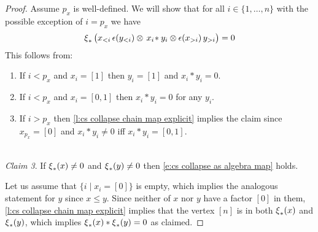 \begin{proof}
	Assume $p_x$ is well-defined.
	We will show that for all $i \in \{1,\dots,n\}$ with the possible exception of $i = p_x$ we have
	\begin{equation} \label{e:case main lemma third claim}
	\operatorname{\xi}_\ast \big( x_{<i} \, \epsilon(y_{<i}) \otimes \, x_{i} \! \ast y_{i} \otimes \epsilon(x_{>i}) \, y_{>i} \big) = 0
	\end{equation}
	This follows from:
	\begin{enumerate}
		\item If $i < p_x$ and $x_i = [1]$ then $y_i = [1]$ and $x_i \ast y_i = 0$.
		\item If $i < p_x$ and $x_i = [0,1]$ then $x_i \ast y_i = 0$ for any $y_i$.
		\item If $i > p_x$ then \cref{l:cs collapse chain map explicit} implies the claim since $x_{p_x} = [0]$ and $x_i \ast y_i \neq 0$ iff $x_i \ast y_i = [0,1]$.
	\end{enumerate}

	\ \\ \noindent \textit{Claim 3}.
	If $\operatorname{\xi}_\ast(x) \neq 0$ and $\operatorname{\xi}_\ast(y) \neq 0$ then \eqref{e:cs collapse as algebra map} holds.

	Let us assume that $\big\{ i \mid x_i = [0] \big\}$ is empty, which implies the analogous statement for $y$ since $x \leq y$.
	Since neither of $x$ nor $y$ have a factor $[0]$ in them, \cref{l:cs collapse chain map explicit} implies that the vertex $[n]$ is in both $\operatorname{\xi}_\ast(x)$ and $\operatorname{\xi}_\ast(y)$, which implies $\operatorname{\xi}_\ast(x) \ast \operatorname{\xi}_\ast(y) = 0$ as claimed.


\end{proof}
